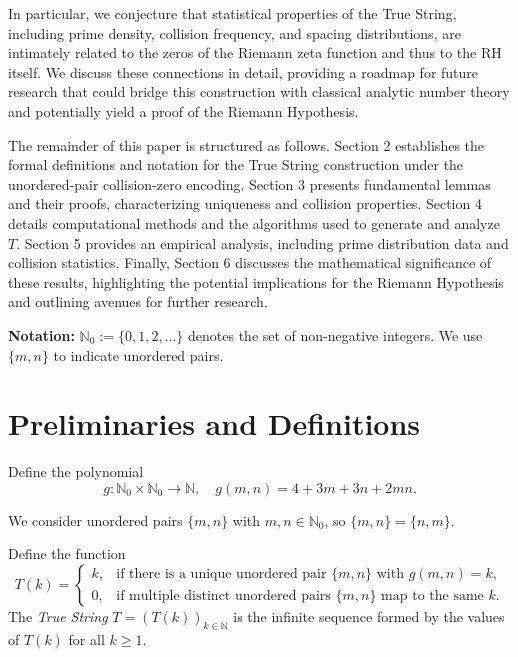 \documentclass[12pt]{article}
\begin{document}
In particular, we conjecture that statistical properties of the True String, including prime density, collision frequency, and spacing distributions, are intimately related to the zeros of the Riemann zeta function and thus to the RH itself. We discuss these connections in detail, providing a roadmap for future research that could bridge this construction with classical analytic number theory and potentially yield a proof of the Riemann Hypothesis.

The remainder of this paper is structured as follows. Section 2 establishes the formal definitions and notation for the True String construction under the unordered-pair collision-zero encoding. Section 3 presents fundamental lemmas and their proofs, characterizing uniqueness and collision properties. Section 4 details computational methods and the algorithms used to generate and analyze \(T\). Section 5 provides an empirical analysis, including prime distribution data and collision statistics. Finally, Section 6 discusses the mathematical significance of these results, highlighting the potential implications for the Riemann Hypothesis and outlining avenues for further research.

\bigskip
\noindent\textbf{Notation:} \(\mathbb{N}_0 := \{0,1,2,\ldots\}\) denotes the set of non-negative integers. We use \(\{m,n\}\) to indicate unordered pairs.

\newpage
\section{Preliminaries and Definitions}

\begin{definition}
Define the polynomial
\[
g: \mathbb{N}_0 \times \mathbb{N}_0 \to \mathbb{N}, \quad g(m,n) = 4 + 3m + 3n + 2mn.
\]
\end{definition}

\begin{definition}
We consider unordered pairs \(\{m,n\}\) with \(m,n \in \mathbb{N}_0\), so \(\{m,n\} = \{n,m\}\).
\end{definition}

\begin{definition}
Define the function
\[
T(k) = \begin{cases}
k, & \text{if there is a unique unordered pair } \{m,n\} \text{ with } g(m,n) = k, \\
0, & \text{if multiple distinct unordered pairs } \{m,n\} \text{ map to the same } k.
\end{cases}
\]
The \emph{True String} \(T = (T(k))_{k \in \mathbb{N}}\) is the infinite sequence formed by the values of \(T(k)\) for all \(k \geq 1\).
\end{definition}
\end{document}

